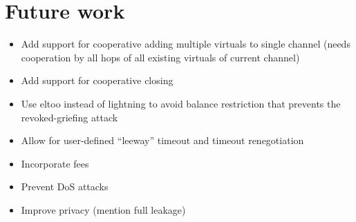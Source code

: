 \section{Future work}
  \begin{itemize}
    \item Add support for cooperative adding multiple virtuals to single channel
    (needs cooperation by all hops of all existing virtuals of current channel)
    \item Add support for cooperative closing
    \item Use eltoo instead of lightning to avoid balance restriction that
    prevents the revoked-griefing attack
    \item Allow for user-defined ``leeway'' timeout and timeout renegotiation
    \item Incorporate fees
    \item Prevent DoS attacks
    \item Improve privacy (mention full \fchan leakage)
  \end{itemize}
